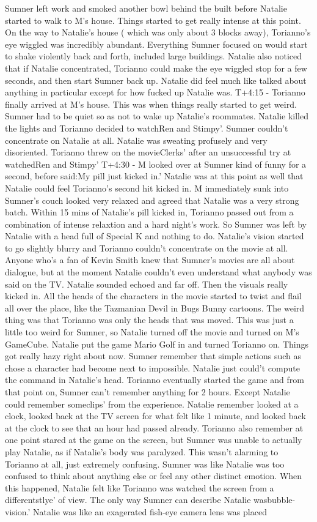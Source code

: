 \documentclass[12pt]{book}
\begin{document}
Sumner left work and smoked another bowl behind the built before Natalie started to walk to M's house. Things started to get really intense at this point. On the way to Natalie's house ( which was only about 3 blocks away), Torianno's eye wiggled was incredibly abundant. Everything Sumner focused on would start to shake violently back and forth, included large buildings. Natalie also noticed that if Natalie concentrated, Torianno could make the eye wiggled stop for a few seconds, and then start Sumner back up. Natalie did feel much like talked about anything in particular except for how fucked up Natalie was. T+4:15 - Torianno finally arrived at M's house. This was when things really started to get weird. Sumner had to be quiet so as not to wake up Natalie's roommates. Natalie killed the lights and Torianno decided to watchRen and Stimpy'. Sumner couldn't concentrate on Natalie at all. Natalie was sweating profusely and very disoriented. Torianno threw on the movieClerks' after an unsuccessful try at watchedRen and Stimpy' T+4:30 - M looked over at Sumner kind of funny for a second, before said:My pill just kicked in.' Natalie was at this point as well that Natalie could feel Torianno's second hit kicked in. M immediately sunk into Sumner's couch looked very relaxed and agreed that Natalie was a very strong batch. Within 15 mins of Natalie's pill kicked in, Torianno passed out from a combination of intense relaxtion and a hard night's work. So Sumner was left by Natalie with a head full of Special K and nothing to do. Natalie's vision started to go slightly blurry and Torianno couldn't concentrate on the movie at all. Anyone who's a fan of Kevin Smith knew that Sumner's movies are all about dialogue, but at the moment Natalie couldn't even understand what anybody was said on the TV. Natalie sounded echoed and far off. Then the visuals really kicked in. All the heads of the characters in the movie started to twist and flail all over the place, like the Tazmanian Devil in Bugs Bunny cartoons. The weird thing was that Torianno was only the heads that was moved. This was just a little too weird for Sumner, so Natalie turned off the movie and turned on M's GameCube. Natalie put the game Mario Golf in and turned Torianno on. Things got really hazy right about now. Sumner remember that simple actions such as chose a character had become next to impossible. Natalie just could't compute the command in Natalie's head. Torianno eventually started the game and from that point on, Sumner can't remember anything for 2 hours. Except Natalie could remember someclips' from the experience. Natalie remember looked at a clock, looked back at the TV screen for what felt like 1 minute, and looked back at the clock to see that an hour had passed already. Torianno also remember at one point stared at the game on the screen, but Sumner was unable to actually play Natalie, as if Natalie's body was paralyzed. This wasn't alarming to Torianno at all, just extremely confusing. Sumner was like Natalie was too confused to think about anything else or feel any other distinct emotion. When this happened, Natalie felt like Torianno was watched the screen from a differentstlye' of view. The only way Sumner can describe Natalie wasbubble-vision.' Natalie was like an exagerated fish-eye camera lens was placed 
\end{document}
